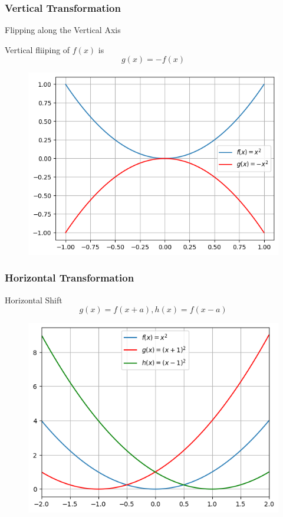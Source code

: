 \documentclass{beamer}
\begin{document}
\begin{frame}
  \frametitle{Vertical Transformation}
  \begin{block}{Flipping along the Vertical Axis} 

    Vertical fliiping of \(f(x) \) is 
    \[g(x) = - f (x) \]
    
  \end{block}

  \begin{figure}[h]    
    \centering
    \includegraphics[scale=0.5]{vertical_flip.png}
    \end{figure}

\end{frame}
\begin{frame}
  \frametitle{Horizontal Transformation}
  \begin{block}{Horizontal Shift}
    \[g(x) = f(x+a), h(x) = f(x-a)\]
  \end{block}
  \begin{figure}[h]    
    \centering
    \includegraphics[scale=0.5]{horizontal-shift.png}
    \end{figure}
  \end{frame}
\end{document}
